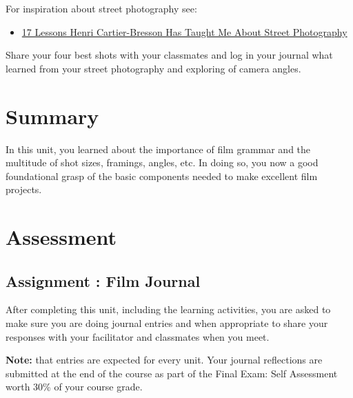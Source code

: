 \documentclass[
]{book}
\providecommand{\tightlist}{%
  \setlength{\itemsep}{0pt}\setlength{\parskip}{0pt}}
\begin{document}
\begin{reflect}
For inspiration about street photography see:

\begin{itemize}
\tightlist
\item
  \href{https://erickimphotography.com/blog/2014/12/09/17-lessons-henri-cartier-bresson-taught-street-photography/}{17 Lessons Henri Cartier-Bresson Has Taught Me About Street Photography}
\end{itemize}

Share your four best shots with your classmates and log in your journal what learned from your street photography and exploring of camera angles.
\end{reflect}

\hypertarget{summary-4}{%
\section*{Summary}\label{summary-4}}

In this unit, you learned about the importance of film grammar and the multitude of shot sizes, framings, angles, etc. In doing so, you now a good foundational grasp of the basic components needed to make excellent film projects.

\hypertarget{assessment-4}{%
\section*{Assessment}\label{assessment-4}}

\begin{assessment}
\hypertarget{assignment-film-journal}{%
\subsection*{Assignment : Film Journal}\label{assignment-film-journal}}

After completing this unit, including the learning activities, you are asked to make sure you are doing journal entries and when appropriate to share your responses with your facilitator and classmates when you meet.
\end{assessment}

\begin{caution}
\textbf{Note:} that entries are expected for every unit. Your journal reflections are submitted at the end of the course as part of the Final Exam: Self Assessment worth 30\% of your course grade.
\end{caution}
\end{document}
